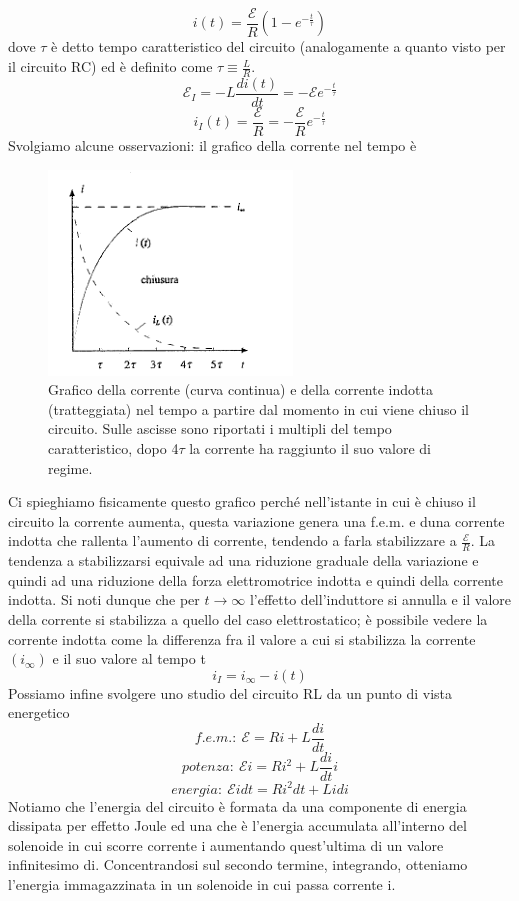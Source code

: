 \documentclass[10pt,a4paper]{article}
\begin{document}
\[i(t) = \frac{\mathcal{E}}{R}(1-e^{-\frac{t}{\tau}})\]
dove $\tau$ è detto tempo caratteristico del circuito (analogamente a quanto visto per il circuito RC) ed è definito come \(\tau \equiv \frac{L}{R}\).
\[\mathcal{E}_I = -L\frac{di(t)}{dt}=-\mathcal{E}e^{-\frac{t}{\tau}}\]
\[i_I(t) = \frac{\mathcal{E}}{R} = -\frac{\mathcal{E}}{R}e^{-\frac{t}{\tau}}\]
Svolgiamo alcune osservazioni: il grafico della corrente nel tempo è
\begin{figure}[h!]
	\centering
	\includegraphics[width=0.4\linewidth]{images/corrente_RL}
	\caption{Grafico della corrente (curva continua) e della corrente indotta (tratteggiata) nel tempo a partire dal momento in cui viene chiuso il circuito. Sulle ascisse sono riportati i multipli del tempo caratteristico, dopo 4\(\tau\) la corrente ha raggiunto il suo valore di regime.}
	\label{fig:correnterl}
\end{figure}
\FloatBarrier
Ci spieghiamo fisicamente questo grafico perché nell'istante in cui è chiuso il circuito la corrente aumenta, questa variazione genera una f.e.m. e duna corrente indotta che rallenta l'aumento di corrente, tendendo a farla stabilizzare a \(\frac{\mathcal{E}}{R}\). La tendenza a stabilizzarsi equivale ad una riduzione graduale della variazione e quindi ad una riduzione della forza elettromotrice indotta e quindi della corrente indotta. Si noti dunque che per \(t\to\infty\) l'effetto dell'induttore si annulla e il valore della corrente si stabilizza a quello del caso elettrostatico; è possibile vedere la corrente indotta come la differenza fra il valore a cui si stabilizza la corrente \((i_{\infty})\) e il suo valore al tempo t
\[i_I = i_\infty - i(t)\]
Possiamo infine svolgere uno studio del circuito RL da un punto di vista energetico
\[f.e.m.:\ \mathcal{E} = Ri+L\frac{di}{dt}\]
\[potenza:\ \mathcal{E}i = Ri^2+L\frac{di}{dt}i\]
\[energia:\  \mathcal{E}idt = Ri^2dt+Lidi\]
Notiamo che l'energia del circuito è formata da una componente di energia dissipata per effetto Joule ed una che è l'energia accumulata all'interno del solenoide in cui scorre corrente i aumentando quest'ultima di un valore infinitesimo di. Concentrandosi sul secondo termine, integrando, otteniamo l'energia immagazzinata in un solenoide in cui passa corrente i. 
\end{document}
